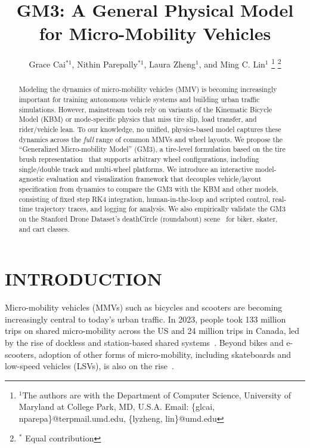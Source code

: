 \documentclass[letterpaper, 10 pt, conference]{ieeeconf}  %
\title{\LARGE \bf
{\bf GM3:} A General Physical Model for Micro-Mobility Vehicles
}
\author{Grace Cai$^{*1}$, Nithin Parepally$^{*1}$, Laura Zheng$^{1}$, and Ming C. Lin$^{1}$%
\thanks{$^{1}$The authors are with the Department of Computer
Science, University of Maryland at College Park, MD,
U.S.A.
        Email: \{glcai, nparepa\}@terpmail.umd.edu, \{lyzheng, lin\}@umd.edu} %
\thanks{$^{*}$ Equal contribution}%
}
\begin{document}
\maketitle
\thispagestyle{empty}
\pagestyle{empty}


\begin{abstract}
    Modeling the dynamics of micro-mobility vehicles (MMV) is becoming increasingly important for training autonomous vehicle systems and building urban traffic simulations. However, mainstream tools rely on variants of the Kinematic Bicycle Model (KBM) \cite{mathworksBicycleKinematicModel, autowareMpcLateralController,li2024tactics2d, highwayEnv} or mode-specific physics that miss tire slip, load transfer, and rider/vehicle lean. To our knowledge, no unified, physics-based model captures these dynamics across the {\em full} range of common MMVs and wheel layouts. We propose the ``Generalized Micro-mobility Model'' (GM3), a tire-level formulation based on the tire brush representation~\cite{svendenius2003brush, deur20043d, svendenius2004brush} that supports arbitrary wheel configurations, including single/double track and multi-wheel platforms. We introduce an interactive model-agnostic evaluation and visualization framework that decouples vehicle/layout specification from dynamics to compare the GM3 with the KBM and other models, consisting of fixed step RK4 integration, human-in-the-loop and scripted control, real-time trajectory traces, and logging for analysis. We also empirically validate the GM3 on the Stanford Drone Dataset's deathCircle (roundabout) scene~\cite{robicquet2017learning} for biker, skater, and cart classes.
\end{abstract}


\section{INTRODUCTION}
Micro-mobility vehicles (MMVs) such as bicycles and scooters are becoming increasingly central to today's urban traffic. In 2023, people took 133 million trips on shared micro-mobility across the US and 24 million trips in Canada, led by the rise of dockless and station-based shared systems~\cite{NACTOSharedMicromobility2023}. Beyond bikes and e-scooters, adoption of other forms of micro-mobility, including skateboards and low-speed vehicles (LSVs), is also on the rise~\cite{LSPTVaug2024, OIAStateOutdoorMarket2022}. 
\end{document}
